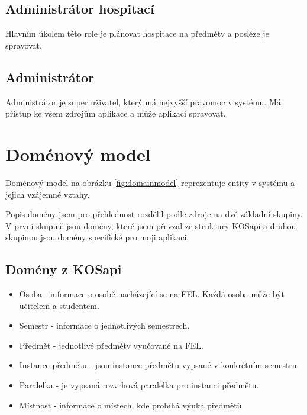 \subsection{Administrátor hospitací}
Hlavním úkolem této role je plánovat hospitace na předměty a posléze je spravovat.

\subsection{Administrátor}
Administrátor je super uživatel, který má nejvyšší pravomoc v systému. Má přístup ke všem zdrojům aplikace a může aplikaci spravovat.

\section{Doménový model}
Doménový model na obrázku \ref{fig:domainmodel} reprezentuje entity v systému a jejich vzájemné vztahy. 

Popis domény jsem pro přehlednost rozdělil podle zdroje na dvě základní skupiny. V první skupině jsou domény, které jsem převzal ze struktury KOSapi a druhou skupinou jsou domény specifické pro moji aplikaci. 

\subsection{Domény z KOSapi}
\begin{itemize}
\item Osoba - informace o osobě nacházející se na FEL. Každá osoba může být učitelem a studentem.
\item Semestr - informace o jednotlivých semestrech. 
\item Předmět - jednotlivé předměty vyučované na FEL.
\item Instance předmětu - jsou instance předmětu vypsané v konkrétním semestru.
\item Paralelka - je vypsaná rozvrhová paralelka pro instanci předmětu.
\item Místnost - informace o místech, kde probíhá výuka předmětů
\end{itemize}

